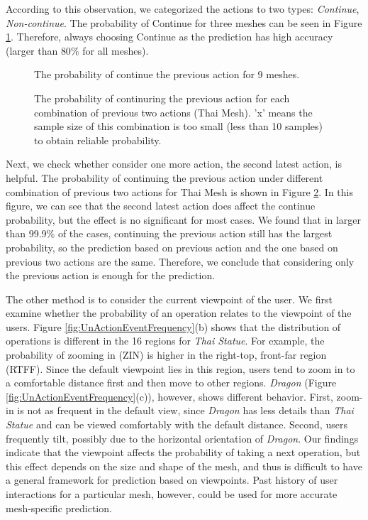 According to this observation, 
we categorized the actions to two types: \textit{Continue}, \textit{Non-continue}. 
The probability of Continue for three meshes can be seen in Figure \ref{f:user:cont_prob}.
Therefore, always choosing Continue as the prediction has high accuracy 
(larger than $80\%$ for all meshes). 
\begin{figure}[htdp!]
    \centering
    \caption{The probability of continue the previous action for 9 meshes.}
    \label{f:user:cont_prob}
\end{figure}

\begin{figure}
    \centering
    \caption{The probability of continuring the previous action for each combination of previous two actions (Thai Mesh).
    'x' means the sample size of this combination is too small (less than 10 samples) to obtain reliable probability.}
    \label{f:user:prev2}
\end{figure}
Next, we check whether consider one more action, the second latest action, is helpful. 
The probability of continuing the previous action under different combination of
previous two actions for Thai Mesh is shown in Figure \ref{f:user:prev2}.
In this figure, we can see that the second latest action does affect the 
continue probability, but the effect is no significant for most cases. 
We found that in larger than 99.9\% of the cases, 
continuing the previous action still has the largest probability,
so the prediction based on previous action and the one based on previous two actions are the same. 
Therefore, we conclude that considering only the previous action is enough for the prediction.

The other method is to consider the current viewpoint of the user.
We first examine whether the probability of an operation relates to
the viewpoint of the users.  Figure
\ref{fig:UnActionEventFrequency}(b) shows that the distribution of
operations is different in the 16 regions for \textit{Thai Statue}.
For example, the probability of zooming in (ZIN)
is higher in the right-top, front-far region (RTFF).  Since
the default viewpoint lies in this region, users tend to zoom in to a
comfortable distance first and then move to other regions.  
\textit{Dragon} (Figure
\ref{fig:UnActionEventFrequency}(c)), however, shows different
behavior.  First, zoom-in is not as frequent in the
default view, since \textit{Dragon} has less details than \textit{Thai
Statue} and can be viewed comfortably with the default distance.
Second, users frequently tilt, possibly due to 
the horizontal orientation of \textit{Dragon}.  Our
findings indicate that the viewpoint affects the probability of taking a next operation, 
but this effect depends on the size and shape of the mesh,
and thus is difficult to have a general framework for prediction based
on viewpoints.  
Past history of user interactions for a particular mesh, 
however, could be used for more accurate mesh-specific prediction.


